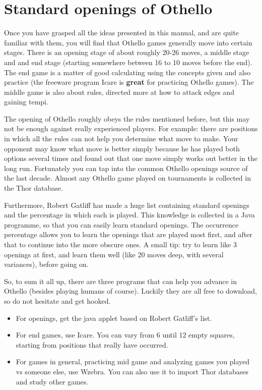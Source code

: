 \documentclass[12pt,twoside]{report}
\begin{document}
\section{Standard openings of Othello}
Once you have grasped all the ideas presented in this manual, and
are quite familiar with them, you will find that Othello games
generally move into certain stages. There is an opening stage of
about roughly 20-26 moves, a middle stage and and end stage
(starting somewhere between 16 to 10 moves before the end). The
end game is a matter of good calculating using the concepts given
and also practice (the freeware program Icare is \textbf{great}
for practicing Othello games). The middle game is also about
rules, directed more at how to attack edges and gaining tempi.

The opening of Othello roughly obeys the rules mentioned before,
but this may not be enough against really experienced players. For
example: there are positions in which all the rules can not help
you determine what move to make. Your opponent may know what move
is better simply because he has played both options several times
and found out that one move simply works out better in the long
run. Fortunately you can tap into the common Othello openings
source of the last decade. Almost any Othello game played on
tournaments is collected in the Thor database.

Furthermore, Robert Gatliff
has made a huge list containing standard openings and the
percentage in which each is played. This knowledge is collected in
a Java programme, so that you can easily learn standard openings.
The occurrence percentage allows you to learn the openings that
are played most first, and after that to continue into the more
obscure ones. A small tip: try to learn like 3 openings at first,
and learn them well (like 20 moves deep, with several variances),
before going on.

So, to sum it all up, there are three programs that can help you
advance in Othello (besides playing humans of course). Luckily
they are all free to download, so do not hesitate and get hooked.
\begin{itemize}
\item For openings, get the java applet based on Robert Gatliff's list.
\item For end games, use Icare. You can vary from 6 until 12 empty
squares, starting from positions that really have occurred.
\item For games in general, practicing mid game and analyzing
games you played vs someone else, use Wzebra. You can also use it
to import Thor databases and study other games.
\end{itemize}
\end{document}
